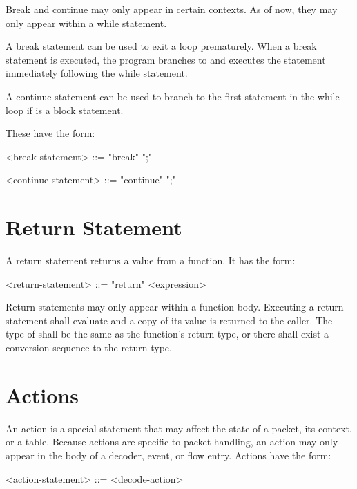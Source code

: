 Break and continue may only appear in certain contexts. As of now, they may only appear within a while statement.

A break statement can be used to exit a loop prematurely. When a break statement is executed, the program branches to and executes the statement immediately following the while statement.

A continue statement can be used to branch to the first statement in the while loop if  is a block statement. 

These have the form:

\begin{minip}
\begin{grammar}
<break-statement> ::= "break" ";"

<continue-statement> ::= "continue" ";"
\end{grammar}
\end{minip}

\section{Return Statement} \label{guide:return_stmt}

A return statement returns a value from a function. It has the form:

\begin{minip}
\begin{grammar}
<return-statement> ::= "return" <expression>
\end{grammar}
\end{minip}

Return statements may only appear within a function body. Executing a return statement shall evaluate  and a copy of its value is returned to the caller. The type of  shall be the same as the function's return type, or there shall exist a conversion sequence to the return type.

\section{Actions} \label{guide:action}

An action is a special statement that may affect the state of a packet, its context, or a table. Because actions are specific to packet handling, an action may only appear in the body of a decoder, event, or flow entry. Actions have the form:

\begin{minip}
\begin{grammar}
<action-statement> ::=
<decode-action>
\end{grammar}
\end{minip}



